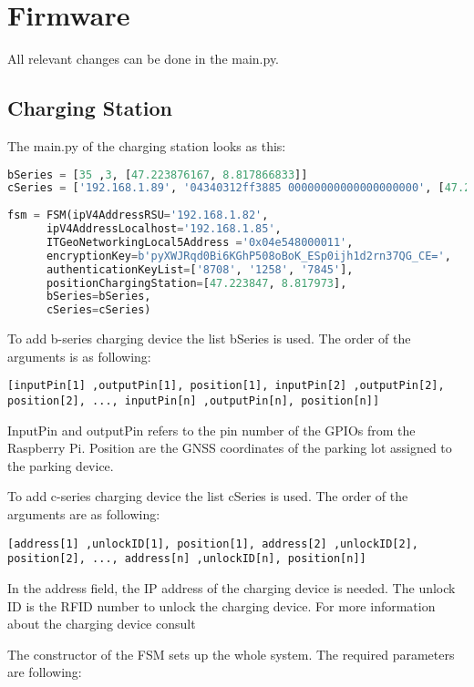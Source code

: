 \section{Firmware}
All relevant changes can be done in the main.py.
\subsection{Charging Station}
The main.py of the charging station looks as this:
\begin{lstlisting}[language=Python]
bSeries = [35 ,3, [47.223876167, 8.817866833]]
cSeries = ['192.168.1.89', '04340312ff3885 00000000000000000000', [47.223861167, 8.8178905]]
	
fsm = FSM(ipV4AddressRSU='192.168.1.82',
	  ipV4AddressLocalhost='192.168.1.85',
	  ITGeoNetworkingLocal5Address ='0x04e548000011',
	  encryptionKey=b'pyXWJRqd0Bi6KGhP508oBoK_ESp0ijh1d2rn37QG_CE=',
	  authenticationKeyList=['8708', '1258', '7845'],
	  positionChargingStation=[47.223847, 8.817973],
	  bSeries=bSeries,
	  cSeries=cSeries)		
\end{lstlisting}

To add b-series charging device the list bSeries is used. The order of the arguments is as following:
\begin{lstlisting}
[inputPin[1] ,outputPin[1], position[1], inputPin[2] ,outputPin[2], position[2], ..., inputPin[n] ,outputPin[n], position[n]]
\end{lstlisting}
InputPin and outputPin refers to the pin number of the GPIOs from the Raspberry Pi. Position are the GNSS coordinates of the parking lot assigned to the parking device.

To add c-series charging device the list cSeries is used. The order of the arguments are as following:
\begin{lstlisting}
[address[1] ,unlockID[1], position[1], address[2] ,unlockID[2], position[2], ..., address[n] ,unlockID[n], position[n]]
\end{lstlisting}

In the address field, the IP address of the charging device is needed. The unlock ID is the RFID number to unlock the charging device. For more information about the charging device consult \cite{KEBAP30_UDP_Programmers_Guide}

The constructor of the FSM sets up the whole system. The required parameters are following:

